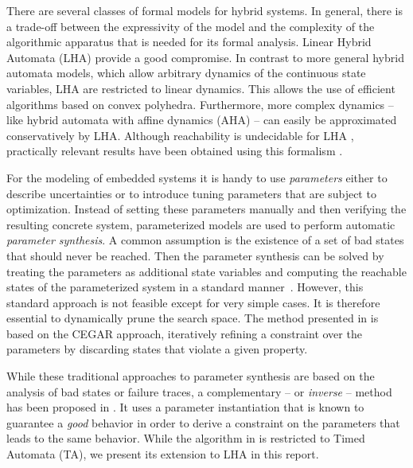 \documentclass{llncs}
\begin{document}
There are several classes of formal models for hybrid systems. In
general, there is a trade-off between the expressivity of the model
and the complexity of the algorithmic apparatus that is needed for its
formal analysis. Linear Hybrid Automata (LHA) provide a good
compromise. In contrast to more general hybrid automata models, which
allow arbitrary dynamics of the continuous state variables, LHA are
restricted to linear dynamics. This allows the use of efficient
algorithms based on convex polyhedra. Furthermore, more complex
dynamics -- like hybrid automata with affine dynamics (AHA) -- can
easily be approximated conservatively by LHA.  Although reachability
is undecidable for LHA \cite{HKPV:95}, practically relevant results
have been obtained using this formalism \cite{SMF:97,Fre:2006}.

For the modeling of embedded systems it is handy to use
\emph{parameters} either to describe uncertainties or to introduce
tuning parameters that are subject to optimization. Instead of setting
these parameters manually and then verifying the resulting concrete
system, parameterized models are used to perform automatic
\emph{parameter synthesis}. A common assumption is the existence of a
set of bad states that should never be reached. Then the parameter
synthesis can be solved by treating the parameters as additional state
variables and computing the reachable states of the parameterized
system in a standard manner~\cite{HHW:97}. However, this 
standard approach is not feasible except for
very simple cases. It is therefore essential to dynamically prune the
search space. The method presented in \cite{FJK:2008} is based on the
CEGAR approach, iteratively refining a constraint over the parameters
by discarding states that violate a given property.

While these traditional approaches to parameter synthesis are based on
the analysis of bad states or failure traces, a complementary -- or
\emph{inverse} -- method has been proposed in \cite{ACEF:2009}. It
uses a parameter instantiation that is known to guarantee a
\emph{good} behavior in order to derive a constraint on the parameters
that leads to the same behavior. While the algorithm in
\cite{ACEF:2009} is restricted to Timed Automata (TA), we present its
extension to LHA in this report. 
\end{document}

